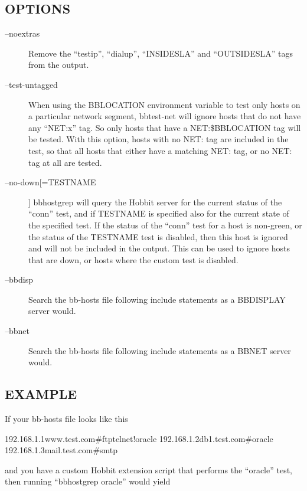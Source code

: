 \subsection{OPTIONS}
\begin{description}
\item[--noextras] Remove the ``testip'', ``dialup'', ``INSIDESLA'' and ``OUTSIDESLA'' tags from the output. 

 

\item[--test-untagged] When using the BBLOCATION environment variable
  to test only hosts on a particular network segment, bbtest-net will
  ignore hosts that do not have any ``NET:x'' tag. So only hosts that
  have a NET:\$BBLOCATION tag will be tested.   With this option,
  hosts with no NET: tag are included in the test, so that all hosts
  that either have a matching NET: tag, or no NET: tag at all are
  tested. 


 

\item[--no-down[=TESTNAME]] bbhostgrep will query the Hobbit server
  for the current status of the ``conn'' test, and if TESTNAME is
  specified also for the current state of the specified test. If the
  status of the ``conn'' test for a host is non-green, or the status
  of the TESTNAME test is disabled, then this host is ignored and will
  not be included in the output. This can be used to ignore hosts that
  are down, or hosts where the custom test is disabled. 


 

\item[--bbdisp] Search the bb-hosts file following include statements
  as a BBDISPLAY server would. 


 

\item[--bbnet] Search the bb-hosts file following include statements
  as a BBNET server would. 


 


\end{description}
\subsection{EXAMPLE}
 If your bb-hosts file looks like this 

  
192.168.1.1www.test.com\#ftptelnet!oracle  
192.168.1.2db1.test.com\#oracle  
192.168.1.3mail.test.com\#smtp 


  and you have a custom Hobbit extension script that performs the
  ``oracle'' test, then running ``bbhostgrep oracle'' would yield 



